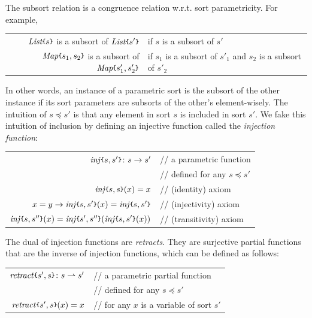 \documentclass[UTF8,11pt]{article}
\theoremstyle{plain}
\theoremstyle{definition}
\theoremstyle{remark}
\newcommand{\List}{\textit{List}}
\newcommand{\Map}{\textit{Map}}
\newcommand{\parametric}[2]{{#1}\raisebox{.2ex}{\texttt{\footnotesize{\{}}}#2\raisebox{.2ex}{\texttt{\footnotesize{\}}}}}
\newcommand{\doubleslash}{/\!/{ }}
\newcommand{\sharpsymbol}{\#}
\newcommand{\KSort}{\texttt{\sharpsymbol Sort}}
\newcommand{\KSortList}{\texttt{\sharpsymbol SortList}}
\newcommand{\inj}[2]{\parametric{\mathit{inj}}{#1, #2}}
\newcommand{\retract}[2]{\parametric{\mathit{retract}}{#1, #2}}
\begin{document}
The subsort relation is a congruence relation w.r.t. sort parametricity.
For example,
\begin{center}
\begin{tabular}{rl}
	$\parametric{\List}{s}$ is a subsort of $\parametric{\List}{s'}$ 
	& if $s$ is a subsort of $s'$ \\
	$\parametric{\Map}{s_1,s_2}$ is a subsort of $\parametric{\Map}{s'_1,s'_2}$
	& if $s_1$ is a subsort of $s'_1$ and $s_2$ is a subsort of $s'_2$
\end{tabular}
\end{center}
In other words, an instance of a parametric sort is the subsort of the other 
instance if its sort parameters are subsorts of the other's element-wisely.
The intuition of $s \preceq s'$ is that any element in sort $s$ is included 
in sort $s'$.
We fake this intuition of inclusion by defining an injective function 
called the \emph{injection function}:
\begin{center}
	\begin{tabular}{rl}
		$\inj{s}{s'} \colon s \to s'$
		& \doubleslash a parametric function \\
		& \doubleslash defined for any $s \preceq 
		s'$ \\
		$\inj{s}{s}(x) = x$
		& \doubleslash (identity) axiom \\
		$x = y \to \inj{s}{s'}(x) = \inj{s}{s'}$
		& \doubleslash (injectivity) axiom \\
		$\inj{s}{s''}(x) = \inj{s'}{s''}(\inj{s}{s'}(x))$
		& \doubleslash (transitivity) axiom \\
	\end{tabular}
\end{center}

The dual of injection functions are \emph{retracts}. 
They are surjective partial functions that are the inverse of injection 
functions, which can be defined as follows:
\begin{center}
	\begin{tabular}{rl}
		$\retract{s'}{s} \colon s \rightharpoonup s'$
		& \doubleslash a parametric partial function \\
		& \doubleslash defined for any $s \preceq 
		s'$ \\
		$\retract{s'}{s}(x) = x$
		& \doubleslash for any $x$ is a variable of sort $s'$
	\end{tabular}
\end{center}
\end{document}
